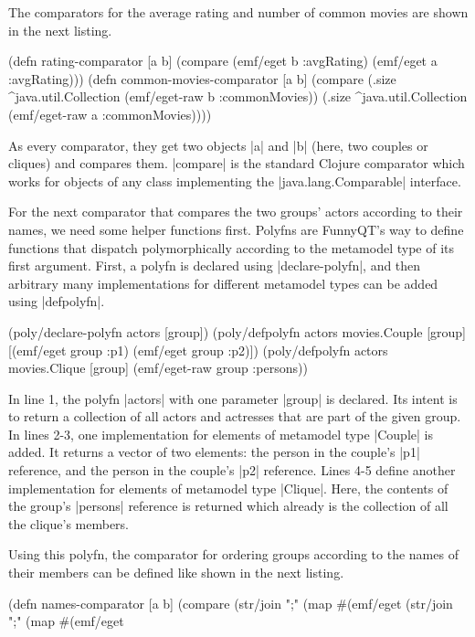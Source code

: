 \documentclass[submission]{eptcs}
\newcommand{\code}{\clojureinline}
\begin{document}
The comparators for the average rating and number of common movies are shown in
the next listing.

\begin{clojurecode}
(defn rating-comparator [a b]
  (compare (emf/eget b :avgRating) (emf/eget a :avgRating)))
(defn common-movies-comparator [a b]
  (compare (.size ^java.util.Collection (emf/eget-raw b :commonMovies))
           (.size ^java.util.Collection (emf/eget-raw a :commonMovies))))
\end{clojurecode}

As every comparator, they get two objects \code|a| and \code|b| (here, two
couples or cliques) and compares them.  \code|compare| is the standard Clojure
comparator which works for objects of any class implementing the
\code|java.lang.Comparable| interface.

For the next comparator that compares the two groups' actors according to their
names, we need some helper functions first.  Polyfns are FunnyQT's way to
define functions that dispatch polymorphically according to the metamodel type
of its first argument.  First, a polyfn is declared using
\code|declare-polyfn|, and then arbitrary many implementations for different
metamodel types can be added using \code|defpolyfn|.

\begin{clojurecode}
(poly/declare-polyfn actors [group])
(poly/defpolyfn actors movies.Couple [group]
  [(emf/eget group :p1) (emf/eget group :p2)])
(poly/defpolyfn actors movies.Clique [group]
  (emf/eget-raw group :persons))
\end{clojurecode}

In line 1, the polyfn \code|actors| with one parameter \code|group| is
declared.  Its intent is to return a collection of all actors and actresses
that are part of the given group.  In lines 2-3, one implementation for
elements of metamodel type \code|Couple| is added.  It returns a vector of two
elements: the person in the couple's \code|p1| reference, and the person in the
couple's \code|p2| reference.  Lines 4-5 define another implementation for
elements of metamodel type \code|Clique|.  Here, the contents of the group's
\code|persons| reference is returned which already is the collection of all the
clique's members.

Using this polyfn, the comparator for ordering groups according to the names of
their members can be defined like shown in the next listing.

\begin{clojurecode}
(defn names-comparator [a b]
  (compare (str/join ";" (map #(emf/eget %
           (str/join ";" (map #(emf/eget %
\end{clojurecode}
\end{document}
